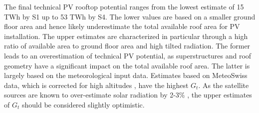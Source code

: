 The final technical PV rooftop potential ranges from the lowest estimate of 15 TWh by S1 up to 53 TWh by S4. The lower values are based on a smaller ground floor area and hence likely underestimate the total available roof area for PV installation. The upper estimates are characterized in particular through a high ratio of available area to ground floor area and high tilted radiation. The former leads to an overestimation of technical PV potential, as superstructures and roof geometry have a significant impact on the total available roof area. The latter is largely based on the meteorological input data. Estimates based on MeteoSwiss data, which is corrected for high altitudes \cite{buffat_scalable_2018}, have the highest $G_t$. As the satellite sources are known to over-estimate solar radiation by 2-3\% \cite{klauser_solarpotentialanalyse_2016}, the upper estimates of $G_t$ should be considered slightly optimistic.


